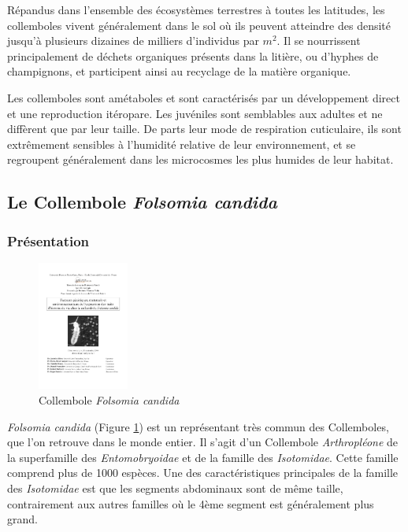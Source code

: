 Répandus dans l'ensemble des écosystèmes terrestres à toutes les latitudes, les
collemboles vivent généralement dans le sol où ils
peuvent atteindre des densité jusqu'à plusieurs dizaines de milliers d'individus
par $m^2$. Il se nourrissent principalement de déchets organiques présents dans
la litière, ou d'hyphes de champignons, et participent ainsi au recyclage de la
matière organique.

Les collemboles sont amétaboles et sont caractérisés par un développement direct
et une reproduction itéropare. Les juvéniles sont semblables aux adultes et ne
diffèrent que par leur taille.
De parts leur mode de respiration cuticulaire, ils sont extrêmement sensibles à
l'humidité relative de leur environnement, et se regroupent généralement dans
les microcosmes les plus humides de leur habitat. 

\subsection{Le Collembole \textit{Folsomia candida}}

\subsubsection{Présentation}

\begin{figure}[!ht]
\begin{center}
\includegraphics[width=3cm,angle=90]{1_CorpsDeThese/Methodo/folsomiacandida.pdf}
\caption[ Collembole
\textit{Folsomia candida}]{Collembole
\textit{Folsomia candida}}
\label{fig:folsomia}
\end{center}
\end{figure}


\textit{Folsomia candida} (Figure \ref{fig:folsomia}) est un représentant très
commun des Collemboles, que l'on retrouve dans le monde entier. Il s'agit d'un
Collembole \textit{Arthropléone} de la superfamille des \textit{Entomobryoidae}
et de la famille des \textit{Isotomidae}. Cette famille comprend plus de 1000
espèces.
Une des caractéristiques principales de la famille des \textit{Isotomidae} est
que les segments abdominaux sont de même taille, contrairement aux autres
familles où le 4ème segment est généralement plus grand.

